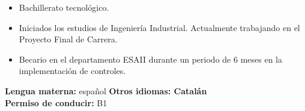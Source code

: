 \documentclass[11p]{article}
\begin{document}
\begin{itemize}
\item Bachillerato tecnológico.
\item Iniciados los estudios de Ingeniería Industrial. Actualmente trabajando en el Proyecto Final de Carrera.
\item Becario en el departamento ESAII durante un periodo de 6 meses en la implementación de controles.
\end{itemize}

\textbf{Lengua materna:} español \hspace*{3cm} \textbf{Otros idiomas: Catalán} \\

\textbf{Permiso de conducir:} B1
\end{document}
